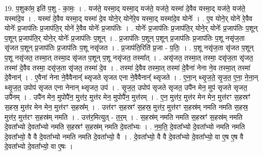 \documentclass[17pt]{extarticle}
\begin{document}
19. प॒शुका॑म॒ इति॑ प॒शु - का॒मः॒ । . यज॑ते॒ यस्मा॒द् यस्मा॒द् यज॑ते॒ यज॑ते॒ यस्मा॑ दे॒वैव यस्मा॒द् यज॑ते॒ यज॑ते॒ यस्मा॑दे॒व । . यस्मा॑ दे॒वैव यस्मा॒द् यस्मा॑ दे॒व योने॒र् योने॑रे॒व यस्मा॒द् यस्मा॑दे॒व योनेः᳚ । . ए॒व योने॒र् योने॑ रे॒वैव योनेः᳚ प्र॒जाप॑तिः प्र॒जाप॑ति॒र् योने॑ रे॒वैव योनेः᳚ प्र॒जाप॑तिः । . योनेः᳚ प्र॒जाप॑तिः प्र॒जाप॑ति॒र् योने॒र् योनेः᳚ प्र॒जाप॑तिः प॒शून् प॒शून् प्र॒जाप॑ति॒र् योने॒र् योनेः᳚ प्र॒जाप॑तिः प॒शून् । . प्र॒जाप॑तिः प॒शून् प॒शून् प्र॒जाप॑तिः प्र॒जाप॑तिः प॒शू नसृ॑ज॒ता सृ॑जत प॒शून् प्र॒जाप॑तिः प्र॒जाप॑तिः प॒शू नसृ॑जत । . प्र॒जाप॑ति॒रिति॑ प्र॒जा - प॒तिः॒ । . प॒शू नसृ॑ज॒ता सृ॑जत प॒शून् प॒शू नसृ॑जत॒ तस्मा॒त् तस्मा॒द सृ॑जत प॒शून् प॒शू नसृ॑जत॒ तस्मा᳚त् । . असृ॑जत॒ तस्मा॒त् तस्मा॒ दसृ॑ज॒ता सृ॑जत॒ तस्मा॑ दे॒वैव तस्मा॒ दसृ॑ज॒ता सृ॑जत॒ तस्मा॑ दे॒व । . तस्मा॑ दे॒वैव तस्मा॒त् तस्मा॑ दे॒वैना॑ नेना ने॒व तस्मा॒त् तस्मा॑ दे॒वैनान्॑ । . ए॒वैना॑ नेना ने॒वैवैनान्᳚ थ्सृजते सृजत एना ने॒वैवैनान्᳚ थ्सृजते । . ए॒ना॒न् थ्सृ॒ज॒ते॒ सृ॒ज॒त॒ ए॒ना॒ ने॒ना॒न् थ्सृ॒ज॒त॒ उपोप॑ सृजत एना नेनान् थ्सृजत॒ उप॑ । . सृ॒ज॒त॒ उपोप॑ सृजते सृजत॒ उपै॑न मेन॒ मुप॑ सृजते सृजत॒ उपै॑नम् । . उपै॑न मेन॒ मुपोपै॑न॒ मुत्त॑र॒ मुत्त॑र मेन॒ मुपोपै॑न॒ मुत्त॑रम् । . ए॒न॒ मुत्त॑र॒ मुत्त॑र मेन मेन॒ मुत्त॑रꣳ स॒हस्रꣳ॑ स॒हस्र॒ मुत्त॑र मेन मेन॒ मुत्त॑रꣳ स॒हस्र᳚म् । . उत्त॑रꣳ स॒हस्रꣳ॑ स॒हस्र॒ मुत्त॑र॒ मुत्त॑रꣳ स॒हस्र॑म् नमति नमति स॒हस्र॒ मुत्त॑र॒ मुत्त॑रꣳ स॒हस्र॑म् नमति । . उत्त॑र॒मित्युत् - त॒र॒म् । . स॒हस्र॑म् नमति नमति स॒हस्रꣳ॑ स॒हस्र॑म् नमति दे॒वता᳚भ्यो दे॒वता᳚भ्यो नमति स॒हस्रꣳ॑ स॒हस्र॑म् नमति दे॒वता᳚भ्यः । . न॒म॒ति॒ दे॒वता᳚भ्यो दे॒वता᳚भ्यो नमति नमति दे॒वता᳚भ्यो॒ वै वै दे॒वता᳚भ्यो नमति नमति दे॒वता᳚भ्यो॒ वै । . दे॒वता᳚भ्यो॒ वै वै दे॒वता᳚भ्यो दे॒वता᳚भ्यो॒ वा ए॒ष ए॒ष वै दे॒वता᳚भ्यो दे॒वता᳚भ्यो॒ वा ए॒षः । \newline
\end{document}
